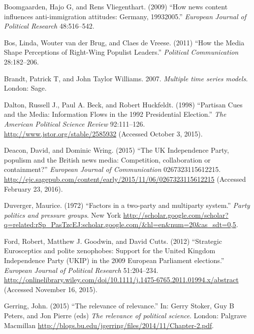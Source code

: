 \documentclass[12pt,article]{article}
\begin{document}
Boomgaarden, Hajo G, and Rens Vliegenthart. (2009) ``How news content
influences anti-immigration attitudes: Germany, 19932005.''
\emph{European Journal of Political Research} 48:516--542.

Bos, Linda, Wouter van der Brug, and Claes de Vreese. (2011) ``How the
Media Shape Perceptions of Right-Wing Populist Leaders.''
\emph{Political Communication} 28:182--206.

Brandt, Patrick T, and John Taylor Williams. 2007. \emph{Multiple time
series models}. London: Sage.

Dalton, Russell J., Paul A. Beck, and Robert Huckfeldt. (1998)
``Partisan Cues and the Media: Information Flows in the 1992
Presidential Election.'' \emph{The American Political Science Review}
92:111--126. \url{http://www.jstor.org/stable/2585932} (Accessed October
3, 2015).

Deacon, David, and Dominic Wring. (2015) ``The UK Independence Party,
populism and the British news media: Competition, collaboration or
containment?'' \emph{European Journal of Communication}
0267323115612215.
\url{http://ejc.sagepub.com/content/early/2015/11/06/0267323115612215}
(Accessed February 23, 2016).

Duverger, Maurice. (1972) ``Factors in a two-party and multiparty
system.'' \emph{Party politics and pressure groups}. New York
\url{http://scholar.google.com/scholar?q=related:rSp_PasTzcEJ:scholar.google.com/\&hl=en\&num=20\&as_sdt=0,5}.

Ford, Robert, Matthew J. Goodwin, and David Cutts. (2012) ``Strategic
Eurosceptics and polite xenophobes: Support for the United Kingdom
Independence Party (UKIP) in the 2009 European Parliament elections.''
\emph{European Journal of Political Research} 51:204--234.
\url{http://onlinelibrary.wiley.com/doi/10.1111/j.1475-6765.2011.01994.x/abstract}
(Accessed November 16, 2015).

Gerring, John. (2015) ``The relevance of relevance.'' In: Gerry Stoker,
Guy B Peters, and Jon Pierre (eds) \emph{The relevance of political
science}. London: Palgrave Macmillan
\url{http://blogs.bu.edu/jgerring/files/2014/11/Chapter-2.pdf}.
\end{document}
